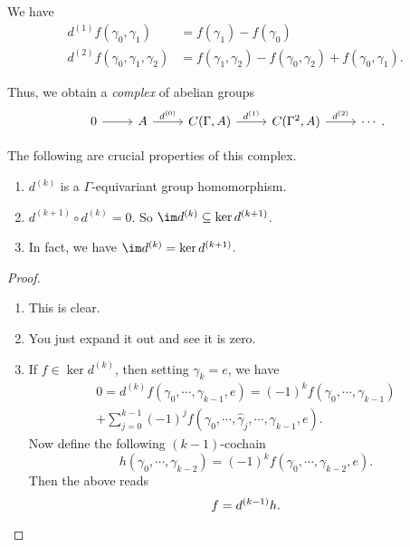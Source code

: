 \documentclass[a4paper]{article}
\begin{document}
\begin{eg}
  We have
  \begin{align*}
    d^{(1)} f(\gamma_0, \gamma_1) &= f(\gamma_1) - f(\gamma_0)\\
    d^{(2)} f(\gamma_0, \gamma_1, \gamma_2) &= f(\gamma_1, \gamma_2) - f(\gamma_0, \gamma_2) + f(\gamma_0, \gamma_1).
  \end{align*}
\end{eg}

Thus, we obtain a \emph{complex} of abelian groups
\[
  \begin{tikzcd}
    0 \ar[r] & A \ar[r, "d^{(0)}"] & C(\Gamma, A) \ar[r, "d^{(1)}"] & C(\Gamma^2, A) \ar[r, "d^{(2)}"] & \cdots
  \end{tikzcd}.
\]

The following are crucial properties of this complex.
\begin{lemma}\leavevmode
  \begin{enumerate}
    \item $d^{(k)}$ is a $\Gamma$-equivariant group homomorphism.
    \item $d^{(k + 1)} \circ d^{(k)} = 0 $. So $\im d^{(k)} \subseteq \ker d^{(k + 1)}$.
    \item In fact, we have $\im d^{(k)} = \ker d^{(k + 1)}$.
  \end{enumerate}
\end{lemma}

\begin{proof}\leavevmode
  \begin{enumerate}
    \item This is clear.
    \item You just expand it out and see it is zero.
    \item If $f \in \ker d^{(k)}$, then setting $\gamma_k = e$, we have
      \begin{multline*}
        0 = d^{(k)} f(\gamma_0, \cdots, \gamma_{k - 1}, e) = (-1)^k f(\gamma_0, \cdots, \gamma_{k - 1}) \\
        + \sum_{j = 0}^{k - 1} (-1)^j f(\gamma_0, \cdots, \hat{\gamma}_j, \cdots, \gamma_{k - 1}, e).
      \end{multline*}
      Now define the following $(k - 1)$-cochain
      \[
        h(\gamma_0, \cdots, \gamma_{k - 2}) = (-1)^k f(\gamma_0, \cdots, \gamma_{k - 2}, e).
      \]
      Then the above reads
      \[
        f = d^{(k - 1)} h.\qedhere
      \]%
  \end{enumerate}
\end{proof}
\end{document}
